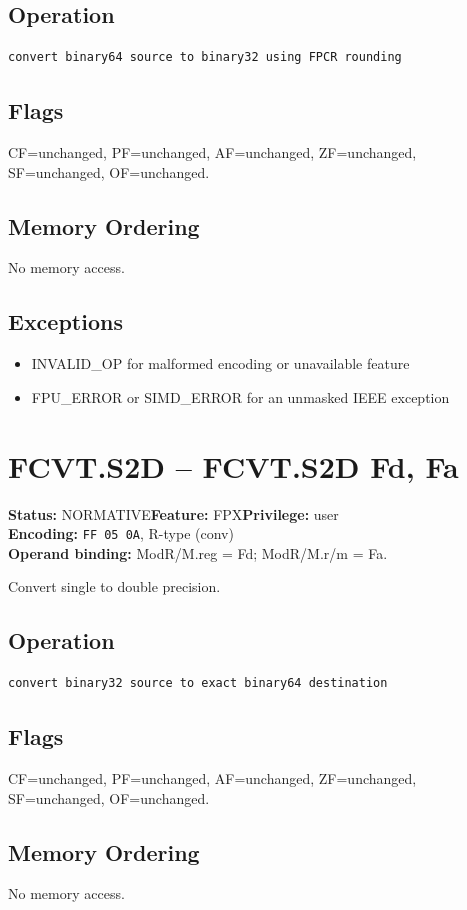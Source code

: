 \documentclass[10pt]{article}
\begin{document}
\subsection*{Operation}
\begin{lstlisting}
convert binary64 source to binary32 using FPCR rounding
\end{lstlisting}
\subsection*{Flags}
CF=unchanged, PF=unchanged, AF=unchanged, ZF=unchanged, SF=unchanged, OF=unchanged.
\subsection*{Memory Ordering}
No memory access.
\subsection*{Exceptions}
\begin{itemize}
\item INVALID\_OP for malformed encoding or unavailable feature
\item FPU\_ERROR or SIMD\_ERROR for an unmasked IEEE exception
\end{itemize}
\clearpage

\section{FCVT.S2D -- FCVT.S2D Fd, Fa}
\textbf{Status:} NORMATIVE\quad \textbf{Feature:} FPX\quad \textbf{Privilege:} user\\
\textbf{Encoding:} \texttt{FF 05 0A}, R-type (conv)\\
\textbf{Operand binding:} ModR/M.reg = Fd; ModR/M.r/m = Fa.

Convert single to double precision.

\subsection*{Operation}
\begin{lstlisting}
convert binary32 source to exact binary64 destination
\end{lstlisting}
\subsection*{Flags}
CF=unchanged, PF=unchanged, AF=unchanged, ZF=unchanged, SF=unchanged, OF=unchanged.
\subsection*{Memory Ordering}
No memory access.
\end{document}
